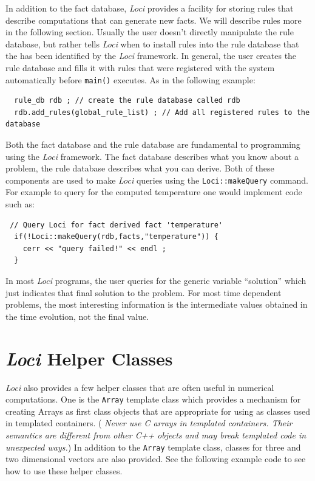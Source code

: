 \documentclass[10pt,epsf,letterpaper,twoside]{book}
\begin{document}
In addition to the fact database, {\it Loci} provides a facility for storing
rules that describe computations that can generate new facts.  We will
describe rules more in the following section.  Usually the user
doesn't directly manipulate the rule database, but rather tells {\it Loci}
when to install rules into the rule database that the has been
identified by the {\it Loci} framework.  In general, the user creates the
rule database and fills it with rules that were registered with the
system automatically before {\tt main()} executes.  As in the
following example:
\begin{verbatim}
  rule_db rdb ; // create the rule database called rdb
  rdb.add_rules(global_rule_list) ; // Add all registered rules to the database
\end{verbatim}
Both the fact database and the rule database are fundamental to
programming using the {\it Loci} framework.  The fact database describes
what you know about a problem, the rule database describes what you
can derive.  Both of these components are used to make {\it Loci} queries
using the {\tt Loci::makeQuery} command.  For example to query for the
computed temperature one would implement code such as:
\begin{verbatim}
 // Query Loci for fact derived fact 'temperature'
  if(!Loci::makeQuery(rdb,facts,"temperature")) {
    cerr << "query failed!" << endl ;
  }
\end{verbatim}
In most {\it Loci} programs, the user queries for the generic variable
``solution'' which just indicates that final solution to the problem.
For most time dependent problems, the most interesting information is
the intermediate values obtained in the time evolution, not the final
value.


\section{{\it Loci} Helper Classes}

{\it Loci} also provides a few helper classes that are often useful in
numerical computations.  One is the {\tt Array} template class which provides a
mechanism for creating Arrays as first class objects that are
appropriate for using as classes used in templated containers. ({\it
Never use C arrays in templated containers.  Their semantics are
different from other C++ objects and may break templated code in
unexpected ways.})  In addition to the {\tt Array} template class,
classes for three and two dimensional vectors are also provided.  See
the following example code to see how to use these helper classes.
\end{document}
